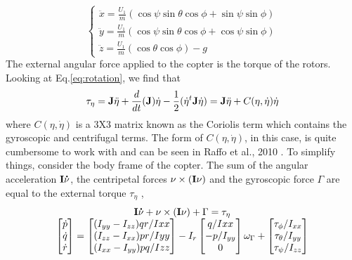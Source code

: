 \documentclass[11pt]{ucthesis}
\begin{document}
\begin{equation}
\left\lbrace\begin{matrix}
\ddot{x} = \frac{U_1}{m} (\cos\psi\sin\theta\cos\phi + \sin\psi\sin\phi)\\
\ddot{y} = \frac{U_1}{m}(\cos\psi\sin\theta\cos\phi + \cos\psi\sin\phi) \\
\ddot{z} = \frac{U_1}{m}(\cos\theta\cos\phi) - g
\end{matrix}\right.
\end{equation}
The external angular force applied to the copter is the torque of the rotors. Looking at Eq.\ref{eq:rotation}, we find that
\vspace{-0.25cm}
\begin{equation}
\tau_{\eta} = \bold{J}\ddot{\eta} + \frac{d}{dt}({\bold{J})}\dot{\eta} -\frac{1}{2}(\dot{\eta}^t \bold{J} \dot{\eta}) = \bold{J}\ddot{\eta} + C(\eta, \dot{\eta})\dot{\eta}
\end{equation}
where $C(\eta, \dot{\eta})$ is a 3X3 matrix known as the Coriolis term which contains the gyroscopic and centrifugal terms. The form of $C(\eta, \dot{\eta})$, in this case, is quite cumbersome to work with and can be seen in Raffo et al., 2010 \cite{raffo2010integral}. To simplify things, consider the body frame of the copter. The sum of the angular acceleration $\bold{I}\bold{\dot{\nu}}$, the centripetal forces $\bold{\nu} \times (\bold{I\nu})$ and the gyroscopic force $\Gamma$ are  equal to the external torque $\tau_{\eta}$ \cite{bhosalemathematical},
\begin{equation}\label{eq:dynamicsEquations}
\begin{matrix}
\bold{I}\bold{\dot{\nu}} + \bold{\nu} \times (\bold{I\nu}) + \Gamma = \tau_{\eta}\\

\begin{bmatrix}
\dot{p}\\
\dot{q}\\
\dot{r}
\end{bmatrix} = 
\begin{bmatrix}
(I_{yy} - I_{zz})qr/I{xx}\\
(I_{zz} - I_{xx})pr/I{yy}\\
(I_{xx} - I_{yy})pq/I{zz}
\end{bmatrix}

-I_r

\begin{bmatrix}
q/I{xx}\\
-p/I_{yy}\\
0
\end{bmatrix} \omega_{\Gamma}

+ 	\begin{bmatrix}
\tau_{\phi} / I_{xx}\\
\tau_{\theta} / I_{yy}\\
\tau_{\psi} / I_{zz}
\end{bmatrix}
\end{matrix}
\end{equation}
\end{document}
